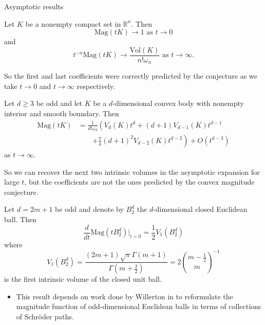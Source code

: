 \documentclass[12pt]{beamer}
\begin{document}
\begin{frame}[allowframebreaks]{Asymptotic results}

\begin{theorem}\label{thm:BCasymp}
Let $K$ be a nonempty compact set in $\mathbb{R}^n$. Then
\begin{equation*}
\text{Mag}(tK) \to 1 \text{ as $t\to0$}
\end{equation*}
and
\begin{equation*}
t^{-n}\text{Mag}(tK) \to \frac{\text{Vol}(K)}{n!\omega_n} \text{ as $t\to\infty$.}
\end{equation*}
\end{theorem}
So the first and last coefficients were correctly predicted by the conjecture as we take $t\to0$ and $t\to\infty$ respectively.

\framebreak

\begin{theorem}\label{thm:GGasymp}
Let $d\geq3$ be odd and let $K$ be a $d$-dimensional convex body with nonempty interior and smooth boundary. Then
\begin{align*}
\text{Mag}(tK) &= \frac{1}{d!\omega_d}\left(V_d(K)t^d+(d+1)V_{d-1}(K)t^{d-1}\right. \\
&\qquad \left.+\frac{\pi}{4}(d+1)^2V_{d-2}(K)t^{d-2}\right)+O\left(t^{d-3}\right)
\end{align*}
as $t\to\infty$.
\end{theorem}
So we can recover the next two intrinsic volumes in the asymptotic expansion for large $t$, but the coefficients are not the ones predicted by the convex magnitude conjecture.

\framebreak

\begin{theorem}\label{thm:meckesasymp}
Let $d=2m+1$ be odd and denote by $B_2^d$ the $d$-dimensional closed Euclidean ball. Then
\begin{equation*}
\frac{d}{dt}\text{Mag}\left(tB_2^d\right)\big\vert_{t=0} = \frac{1}{2}V_1\left(B_2^d\right)
\end{equation*}
where
\begin{equation*}
V_1\left(B_2^d\right) = \frac{(2m+1)\sqrt{\pi}\Gamma\left(m+1\right)}{\Gamma\left(m+\frac{3}{2}\right)} = 2\binom{m-\frac{1}{2}}{m}^{-1}
\end{equation*}
is the first intrinsic volume of the closed unit ball.
\end{theorem}

\begin{itemize}
\item This result depends on work done by Willerton in \cite{willerton_magnitude_2017} to reformulate the magnitude function of odd-dimensional Euclidean balls in terms of collections of Schröder paths.
\end{itemize}

\end{frame}
\end{document}
